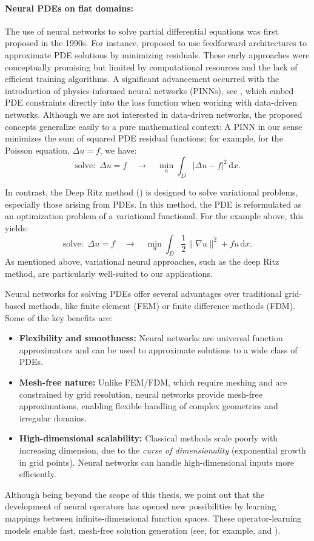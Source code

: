 \documentclass[12pt,openany]{book}
\theoremstyle{plainnormal}
\theoremstyle{remark}
\begin{document}
\paragraph{Neural PDEs on flat domains:}
The use of neural networks to solve partial differential equations was first proposed in the 1990s. For instance, \cite{Lagaris_1998} proposed to use feedforward architectures to approximate PDE solutions by minimizing residuals. These early approaches were conceptually promising but limited by computational resources and the lack of efficient training algorithms. A significant advancement occurred with the introduction of physics-informed neural networks (PINNs), see \cite{RAISSI2019686}, which embed PDE constraints directly into the loss function when working with data-driven networks. Although we are not interested in data-driven networks, the proposed concepts generalize easily to a pure mathematical context: A PINN in our sense minimizes the sum of squared PDE residual functions; for example, for the Poisson equation, $\Delta u = f$, we have: $$ \text{solve: }\,\Delta u = f \quad\rightarrow\quad \min_u \int_D|\Delta u - f| ^2 \,\mathrm{d}x.$$
\par
In contrast, the Deep Ritz method (\cite{deepritzmethoddeep}) is designed to solve variational problems, especially those arising from PDEs. In this method, the PDE is reformulated as an optimization problem of a variational functional. For the example above, this yields: $$\text{solve: } \,\Delta u = f\quad \rightarrow \quad\min_u \int_D \frac{1}{2}\|\nabla u\|^2 + fu \,\mathrm{d}x.$$
As mentioned above, variational neural approaches, such as the deep Ritz method, are particularly well-suited to our applications.
\par
Neural networks for solving PDEs offer several advantages over traditional grid-based methods, like finite element (FEM) or finite difference methods (FDM). Some of the key benefits are: \begin{itemize}
\item \textbf{Flexibility and smoothness:}
Neural networks are universal function approximators and can be used to approximate solutions to a wide class of PDEs. 
\item\textbf{Mesh-free nature:} Unlike FEM/FDM, which require meshing and are constrained by grid resolution, neural networks provide mesh-free approximations, enabling flexible handling of complex geometries and irregular domains.
\item \textbf{High-dimensional scalability:} Classical methods scale poorly with increasing dimension, due to the \emph{curse of dimensionality} (exponential growth in grid points). Neural networks can handle high-dimensional inputs more efficiently.
\end{itemize}
Although being beyond the scope of this thesis, we point out that the development of neural operators has opened new possibilities by learning mappings between infinite-dimensional function spaces. These operator-learning models enable fast, mesh-free solution generation (see, for example, \cite{li2021fourierneuraloperatorparametric} and \cite{Lu_2021}).
\end{document}
